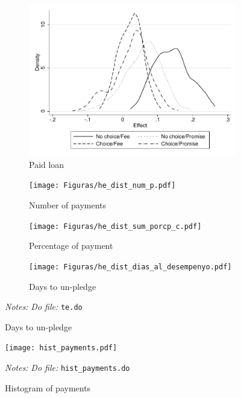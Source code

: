 \documentclass[11pt]{article}
\begin{document}
\begin{figure}[H]
    \caption{Heterogeneous Treatment Effect}
    \label{Treatment Effect}
    \begin{center}
    \begin{subfigure}{0.4\textwidth}
        \caption{Paid loan}
        \centering
        \includegraphics[width=\textwidth]{Figuras/he_dist_des_c.pdf}
    \end{subfigure}
    \begin{subfigure}{0.4\textwidth}
        \caption{Number of payments}
        \centering
        \texttt{[image: Figuras/he\_dist\_num\_p.pdf]}
    \end{subfigure}
     \begin{subfigure}{0.4\textwidth}
      \caption{Percentage of payment}
        \centering
        \texttt{[image: Figuras/he\_dist\_sum\_porcp\_c.pdf]}
    \end{subfigure}
    \begin{subfigure}{0.4\textwidth}
      \caption{Days to un-pledge}
        \centering
        \texttt{[image: Figuras/he\_dist\_dias\_al\_desempenyo.pdf]}
    \end{subfigure}    
    \end{center}
     \footnotesize \textit{Notes: } 
      \footnotesize{ \textit{Do file: }  \texttt{te.do}}
\end{figure}



\begin{figure}[H]
        \caption{Histogram of payments}
    \label{HistPayments}
    \begin{center}
        \centering
        \texttt{[image: hist\_payments.pdf]}
    \end{center}
     \footnotesize \textit{Notes: } 
      \footnotesize{ \textit{Do file: }  \texttt{hist\_payments.do}}
\end{figure}
\end{document}
